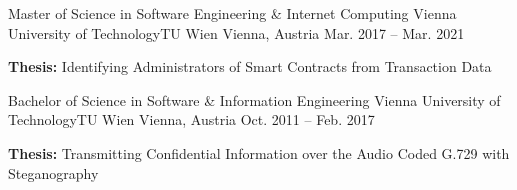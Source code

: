 


\begin{cventries}


\cventry
{Master of Science in Software Engineering \& Internet Computing} %
{Vienna University of Technology{\enskip\cdotp\enskip}TU Wien} %
{Vienna, Austria} %
{Mar. 2017 -- Mar. 2021} %
{ %
\begin{cvitems}
\item {\textbf{Thesis: } Identifying Administrators of Smart Contracts from Transaction Data}
\end{cvitems}
}


\cventry
{Bachelor of Science in Software \& Information Engineering} %
{Vienna University of Technology{\enskip\cdotp\enskip}TU Wien} %
{Vienna, Austria} %
{Oct. 2011 -- Feb. 2017} %
{ %
\begin{cvitems}
\item {\textbf{Thesis: } Transmitting Confidential Information over the Audio Coded G.729 with Steganography}
\end{cvitems}
}


\end{cventries}